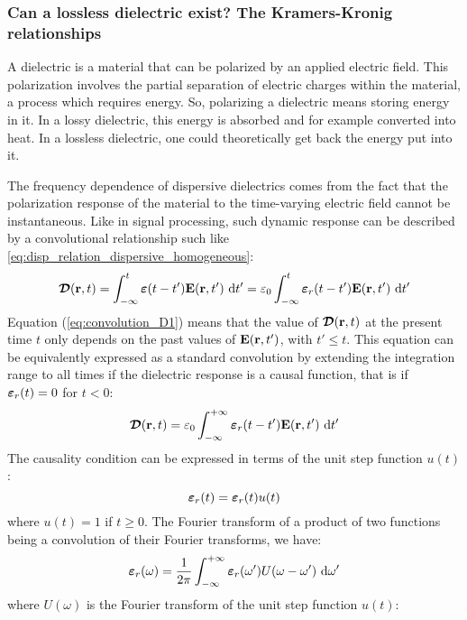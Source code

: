 \subsubsection{Can a lossless dielectric exist? The Kramers-Kronig relationships}
A dielectric is a material that can be polarized by an applied electric field. This polarization involves the partial separation of electric charges within the material, a process which requires energy. So, polarizing a dielectric means storing energy in it. In a lossy dielectric, this energy is absorbed and for example converted into heat. In a lossless dielectric, one could theoretically get back the energy put into it. 

The frequency dependence of dispersive dielectrics comes from the fact that the polarization response of the material to the time-varying electric field cannot be instantaneous. Like in signal processing, such dynamic response can be described by a convolutional relationship such like \ref{eq:disp_relation_dispersive_homogeneous}:
\begin{equation}
 \label{eq:convolution_D1}
 \boldsymbol{\mathcal{D}}(\mathbf{r},t) 
  = \int_{-\infty}^t \boldsymbol{\varepsilon}(t-t')\mathbf{E}(\mathbf{r},t') \, \mathop{}\!\mathrm{d} t'
  = \varepsilon_0 \int_{-\infty}^t \boldsymbol{\varepsilon}_r(t-t')\mathbf{E}(\mathbf{r},t') \, \mathop{}\!\mathrm{d} t'
\end{equation}
Equation (\ref{eq:convolution_D1}) means that the value of $\boldsymbol{\mathcal{D}}(\mathbf{r},t)$ at the present time $t$ only depends on the past values of $\mathbf{E}(\mathbf{r},t')$, with $t'\leq t$. This equation can be equivalently expressed as a standard convolution by extending the integration range to all times if the dielectric response is a causal function, that is if $\boldsymbol{\varepsilon}_r(t)=0$ for $t<0$:
\begin{equation}
 \label{eq:convolution_D}
 \boldsymbol{\mathcal{D}}(\mathbf{r},t) 
  = \varepsilon_0 \int_{-\infty}^{+\infty} \boldsymbol{\varepsilon}_r(t-t')\mathbf{E}(\mathbf{r},t') \, \mathop{}\!\mathrm{d} t'
\end{equation}
The causality condition can be expressed in terms of the unit step function $u(t)$:
\begin{equation}
 \boldsymbol{\varepsilon}_r(t) = \boldsymbol{\varepsilon}_r(t) u(t)
\end{equation}
where $u(t) = 1$ if $t \geq  0$. The Fourier transform of a product of two functions being a convolution of their Fourier transforms, we have:
\begin{equation}
  \label{eq:convolution_frequency_epsr}
 \boldsymbol{\varepsilon}_r(\omega) 
 = 
 \frac{1}{2\pi} \int_{-\infty}^{+\infty}
  \boldsymbol{\varepsilon}_r(\omega') U(\omega - \omega') \, \mathop{}\!\mathrm{d} \omega'
\end{equation}
where $U(\omega)$ is the Fourier transform of the unit step function $u(t)$:
